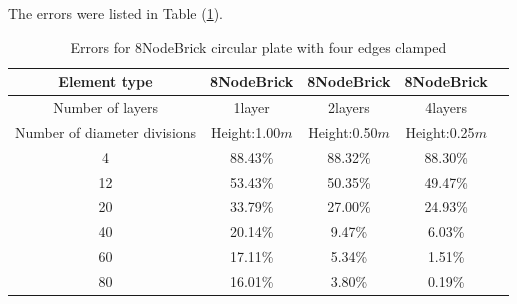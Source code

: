 \documentclass[fleqn,11pt]{article}
\begin{document}
The errors were listed in Table (\ref{table errors for 8NodeBrick circular plate with four edges clamped}).

\begin{table}[H]
  \centering
      \caption{Errors for 8NodeBrick circular plate with four edges clamped}
  \label{table errors for 8NodeBrick circular plate with four edges clamped}
\begin{tabular}{|c|c|c|c|c|}
\hline
Element type     & 8NodeBrick     & 8NodeBrick     & 8NodeBrick      \\ \hline
Number of layers & 1layer         & 2layers         & 4layers          \\ \hline
Number of diameter divisions & Height:1.00$m$ & Height:0.50$m$ & Height:0.25$m$  \\ \hline
4           & 88.43\% & 88.32\% & 88.30\%       \\ \hline
12          & 53.43\% & 50.35\% & 49.47\%       \\ \hline
20          & 33.79\% & 27.00\% & 24.93\%       \\ \hline
40          & 20.14\% & 9.47\%  & 6.03\%        \\ \hline
60          & 17.11\% & 5.34\%  & 1.51\%        \\ \hline
80          & 16.01\% & 3.80\%  & 0.19\%        \\
\hline
\end{tabular}
\end{table}


\end{document}
